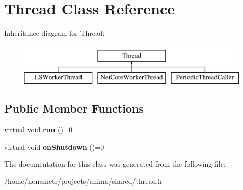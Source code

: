 \hypertarget{classThread}{
\section{Thread Class Reference}
\label{classThread}
}
Inheritance diagram for Thread:\begin{figure}[H]
\begin{center}
\leavevmode
\includegraphics[height=2.000000cm]{classThread}
\end{center}
\end{figure}
\subsection*{Public Member Functions}
\begin{DoxyCompactItemize}
\item 
\hypertarget{classThread_aae90dfabab3e1776cf01a26e7ee3a620}{
virtual void {\bfseries run} ()=0}
\label{classThread_aae90dfabab3e1776cf01a26e7ee3a620}

\item 
\hypertarget{classThread_a9e30c8ade61860ebed96ce7ae5d0c0c1}{
virtual void {\bfseries onShutdown} ()=0}
\label{classThread_a9e30c8ade61860ebed96ce7ae5d0c0c1}

\end{DoxyCompactItemize}


The documentation for this class was generated from the following file:\begin{DoxyCompactItemize}
\item 
/home/nonametr/projects/anima/shared/thread.h\end{DoxyCompactItemize}
